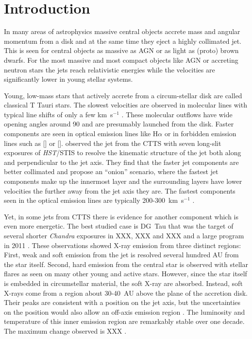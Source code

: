 \section{Introduction} 
In many areas of astrophysics massive central objects accrete mass and angular momentum from a disk and at the same time they eject a highly collimated jet. This is seen for central objects as massive as AGN or as light as (proto) brown dwarfs. For the most massive and most compact objects like AGN or accreting neutron stars the jets reach relativistic energies while the velocities are significantly lower in young stellar systems. 

Young, low-mass stars that actively accrete from a circum-stellar disk are called classical T Tauri stars. The slowest velocities are observed in molecular lines with typical line shifts of only a few km~s$^{-1}$ \citep{2008ApJ...676..472B}. These molecular outflows have wide opening angles around 90\degree{} \citep[e.g.][]{2013A&A...557A.110S} and are presumably launched from the disk. Faster components are seen in optical emission lines like H$\alpha$ or in forbidden emission lines such as [] or []. \citet{2000ApJ...537L..49B} observed the jet from the CTTS  with seven long-slit exposures of \emph{HST}/STIS to resolve the kinematic structure of the jet both along and perpendicular to the jet axis. They find that the faster jet components are better collimated and propose an ``onion'' scenario, where the fastest jet components make up the innermost layer and the surrounding layers have lower velocities the further away from the jet axis they are. The fastest components seen in the optical emission lines are typically 200-300~km~s$^{-1}$ \citep{2004Ap&SS.292..651B,2008ApJ...689.1112C,2013A&A...550L...1S}.

Yet, in some jets from CTTS there is evidence for another component which is even more energetic. The best studied case is DG~Tau that was the target of several shorter \emph{Chandra} exposures in XXX, XXX and XXX and a large program in 2011 \citep{2005ApJ...626L..53G,2008A&A...478..797G,2011ASPC..448..617G}. These observations showed X-ray emission from three distinct regions: First, weak and soft emission from the jet is resolved several hundred AU from the star itself. Second, hard emission from the central star is observed with stellar flares as seen on many other young and active stars. However, since the star itself is embedded in circumstellar material, the soft X-ray are absorbed. Instead, soft X-rays come from a region about 30-40~AU above the plane of the accretion disk. Their peaks are consistent with a position on the jet axis, but the uncertainties on the position would also allow an off-axis emission region \citep{2008A&A...488L..13S}. The luminosity and temperature of this inner emission region are remarkably stable over one decade. The maximum change observed is XXX \citep{SchneiderDGTauXray}.

